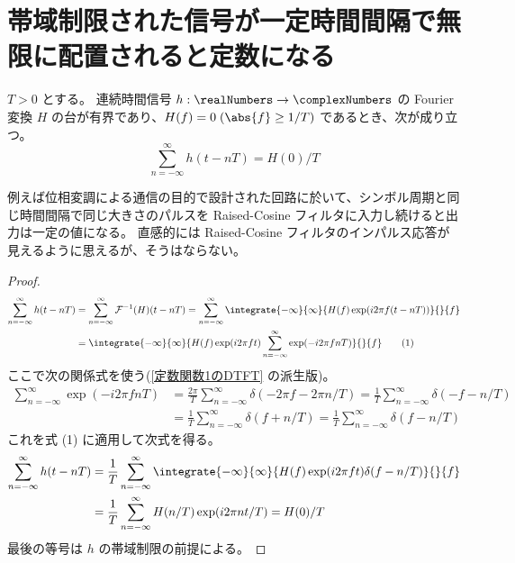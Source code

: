     \section{帯域制限された信号が一定時間間隔で無限に配置されると定数になる}
        \begin{shadebox}
            $T>0$ とする。
            連続時間信号 $h:\realNumbers\to\complexNumbers$ の Fourier 変換 $H$ の台が有界であり、$H(f)=0\;(\abs{f}\geq 1/T)$ であるとき、次が成り立つ。
            \[ \sum_{n=-\infty}^\infty h(t-nT) = H(0)/T \]
        \end{shadebox}
        例えば位相変調による通信の目的で設計された回路に於いて、シンボル周期と同じ時間間隔で同じ大きさのパルスを Raised-Cosine フィルタに入力し続けると出力は一定の値になる。
        直感的には Raised-Cosine フィルタのインパルス応答が見えるように思えるが、そうはならない。
        \begin{proof}
            \begin{align*}
                \sum_{n=-\infty}^\infty h(t-nT) &= \sum_{n=-\infty}^\infty \mathcal{F}^{-1}(H)(t-nT) = \sum_{n=-\infty}^\infty\integrate{-\infty}{\infty}{H(f)\exp(i2\pi f(t-nT))}{}{f} \\
                &= \integrate{-\infty}{\infty}{H(f)\exp(i2\pi ft)\sum_{n=-\infty}^\infty\exp(-i2\pi fnT)}{}{f} \tag{1}
            \end{align*}
            ここで次の関係式を使う(\ref{定数関数1のDTFT} の派生版)。
            \begin{align*}
                \sum_{n=-\infty}^\infty\exp(-i2\pi fnT) &= \frac{2\pi}{T}\sum_{n=-\infty}^\infty\delta(-2\pi f - 2\pi n/T) = \frac{1}{T}\sum_{n=-\infty}^\infty\delta(-f - n/T) \\
                &= \frac{1}{T}\sum_{n=-\infty}^\infty\delta(f + n/T) = \frac{1}{T}\sum_{n=-\infty}^\infty\delta(f - n/T)
            \end{align*}
            これを式 (1) に適用して次式を得る。
            \begin{align*}
                \sum_{n=-\infty}^\infty h(t-nT) &= \frac{1}{T}\sum_{n=-\infty}^\infty\integrate{-\infty}{\infty}{H(f)\exp(i2\pi ft)\delta(f-n/T)}{}{f} \\
                &= \frac{1}{T}\sum_{n=-\infty}^\infty H(n/T)\exp(i2\pi nt/T) = H(0)/T
            \end{align*}
            最後の等号は $h$ の帯域制限の前提による。
        \end{proof}